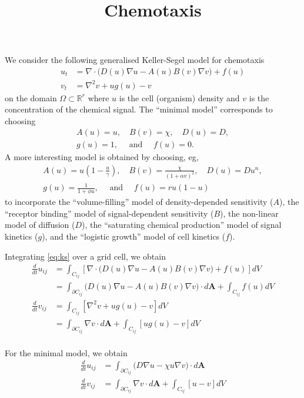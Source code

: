 \documentclass{article}
\begin{document}
\title{Chemotaxis}
\maketitle

We consider the following generalised Keller-Segel \cite{keller70,hillen08}
model for chemotaxis
\begin{equation}
  \label{eq:ks}
  \begin{aligned}
    u_t &= \nabla \cdot \bigl( D(u) \nabla u - A(u) B(v) \nabla v \bigl) + f(u) \\
    v_t &= \nabla^2 v + u g(u) - v
  \end{aligned}
\end{equation}
on the domain $\Omega \subset \mathbb{R}^r$ where $u$ is the cell
(organism) density and $v$ is the concentration of the chemical
signal.  The ``minimal model'' corresponds to choosing
\begin{equation}
  \label{eq:minimal}
  \begin{gathered}
  A(u) = u, \quad
  B(v) = \chi, \quad
  D(u) = D, \\
  g(u) = 1, \quad \text{ and } \quad
  f(u) = 0.
  \end{gathered}
\end{equation}
A more interesting model is obtained by choosing, eg, 
\begin{equation}
  \begin{gathered}
  A(u) = u \left( 1 - \frac{u}{\gamma} \right), \quad
  B(v) = \frac{\chi}{(1 + \alpha v)^2}, \quad
  D(u) = D u^n, \\
  g(u) = \frac{1}{1 + \phi u}, \quad \text{ and } \quad
  f(u) = r u (1 - u)
  \end{gathered}
\end{equation}
to incorporate the ``volume-filling'' model of density-depended
sensitivity ($A$), the ``receptor binding'' model of signal-dependent
sensitivity ($B$), the non-linear model of diffusion ($D$), the
``saturating chemical production'' model of signal kinetics ($g$), and
the ``logistic growth'' model of cell kinetics ($f$).

Integrating \eqref{eq:ks} over a grid cell, we obtain
\begin{align}
  \frac{d}{dt} u_{ij} &= \int_{C_{ij}} \left[ 
    \nabla \cdot \bigl( D(u) \nabla u - A(u) B(v) \nabla v \bigl) + f(u) \right] dV \\
  &= \int_{\partial C_{ij}} \bigl( D(u) \nabla u - A(u) B(v) \nabla v \bigl) \cdot d\bm{A}
       + \int_{C_{ij}} f(u) dV \\
  \frac{d}{dt} v_{ij} &= \int_{C_{ij}} \left[ \nabla^2 v + u g(u) - v \right] dV \\
  &= \int_{\partial C_{ij}} \nabla v \cdot d\bm{A}
     + \int_{C_{ij}} \left[  u g(u) - v \right] dV \\
\end{align}


For the minimal model, we obtain
\begin{align}
  \frac{d}{dt} u_{ij} 
  &= \int_{\partial C_{ij}} \bigl( D \nabla u - \chi u \nabla v \bigl) \cdot d\bm{A} \\
  \frac{d}{dt} v_{ij}
  &= \int_{\partial C_{ij}} \nabla v \cdot d\bm{A}
     + \int_{C_{ij}} \left[  u - v \right] dV \\
\end{align}
\end{document}
